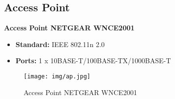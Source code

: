 \newpage
\subsection{Access Point}
\textbf{Access Point NETGEAR WNCE2001}
\begin{itemize}
	\item \textbf{Standard:} IEEE 802.11n 2.0
	\item \textbf{Ports:} 1 x 10BASE-T/100BASE-TX/1000BASE-T 
\end{itemize}
 \begin{figure}[htbp]
	\begin{center}
        \texttt{[image: img/ap.jpg]}
        \caption{Access Point NETGEAR WNCE2001}
    \end{center}
\end{figure}